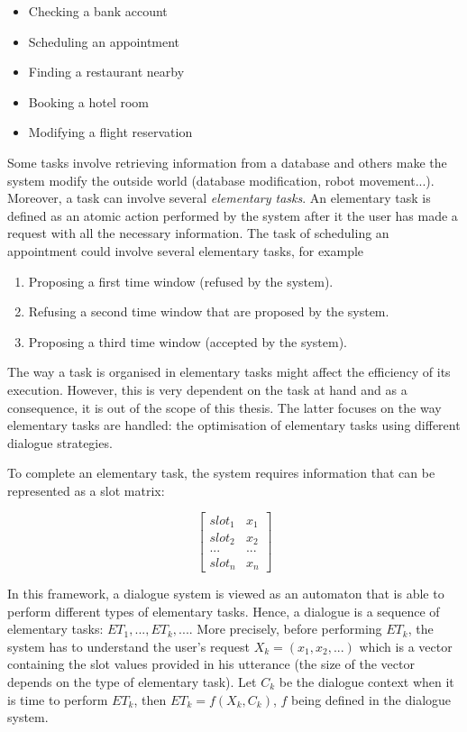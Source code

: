 	\begin{itemize}
		\item Checking a bank account
		\item Scheduling an appointment
		\item Finding a restaurant nearby
		\item Booking a hotel room
		\item Modifying a flight reservation
	\end{itemize}
	
	Some tasks involve retrieving information from a database and others make the system modify the outside world (database modification, robot movement...). Moreover, a task can involve several \textit{elementary tasks}. An elementary task is defined as an atomic action performed by the system after it the user has made a request with all the necessary information. The task of scheduling an appointment could involve several elementary tasks, for example
	
	\begin{enumerate}
		\item Proposing a first time window (refused by the system).
		\item Refusing a second time window that are proposed by the system.
		\item Proposing a third time window (accepted by the system).
	\end{enumerate}
	
	The way a task is organised in elementary tasks might affect the efficiency of its execution. However, this is very dependent on the task at hand and as a consequence, it is out of the scope of this thesis. The latter focuses on the way elementary tasks are handled: the optimisation of elementary tasks using different dialogue strategies.
	
	To complete an elementary task, the system requires information that can be represented as a slot matrix:
	
		$$
		\begin{bmatrix}
			slot_1 & x_1 \\
			slot_2 & x_2 \\
			... & ... \\
			slot_n & x_n
		\end{bmatrix}
		$$
	
	In this framework, a dialogue system is viewed as an automaton that is able to perform different types of elementary tasks. Hence, a dialogue is a sequence of elementary tasks: $ET_1,...,ET_k,...$. More precisely,  before performing $ET_k$, the system has to understand the user's request $X_k = (x_1, x_2, ...)$ which is a vector containing the slot values provided in his utterance (the size of the vector depends on the type of elementary task). Let $C_k$ be the dialogue context when it is time to perform $ET_k$, then $ET_k = f(X_k,C_k)$, $f$ being defined in the dialogue system.
	
